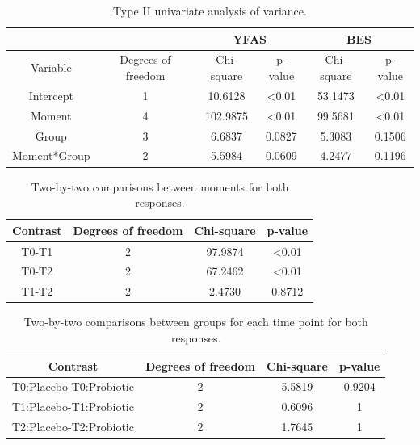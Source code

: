 \documentclass[AMA,STIX1COL]{WileyNJD-v2}
\begin{document}
\begin{table}[H]
\centering
\begin{tabular}{c|c|cc|cc}
\hline
              &                    & \multicolumn{2}{c|}{YFAS}     & \multicolumn{2}{c}{BES}       \\ \hline
Variable      & Degrees of freedom & Chi-square   & p-value        & Chi-square   & p-value        \\ \hline
Intercept     & 1                  & 10.6128      & \textless 0.01 & 53.1473      & \textless 0.01 \\
Moment        & 4                  & 102.9875     & \textless 0.01 & 99.5681      & \textless 0.01 \\
Group         & 3                  & 6.6837       & 0.0827         & 5.3083       & 0.1506         \\
Moment*Group  & 2                  & 5.5984       & 0.0609         & 4.2477       & 0.1196         \\ \hline
\end{tabular}
\caption{Type II univariate analysis of variance.}
\label{tab5}
\end{table}

\begin{table}[H]
\centering
\begin{tabular}{cccc}
\hline
Contrast  & Degrees of freedom & Chi-square   & p-value        \\ \hline
T0-T1     & 2                  & 97.9874      & \textless 0.01 \\
T0-T2     & 2                  & 67.2462      & \textless 0.01 \\
T1-T2     & 2                  & 2.4730       & 0.8712         \\ \hline
\end{tabular}
\caption{Two-by-two comparisons between moments for both responses.}
\label{tab6}
\end{table}

\begin{table}[H]
\centering
\begin{tabular}{cccc}
\hline
Contrast                 & Degrees of freedom & Chi-square   & p-value \\ \hline
T0:Placebo-T0:Probiotic  & 2                  & 5.5819       & 0.9204  \\
T1:Placebo-T1:Probiotic  & 2                  & 0.6096       & 1       \\
T2:Placebo-T2:Probiotic  & 2                  & 1.7645       & 1       \\ \hline
\end{tabular}
\caption{Two-by-two comparisons between groups for each time point for both responses.}
\label{tab7}
\end{table}
\end{document}
